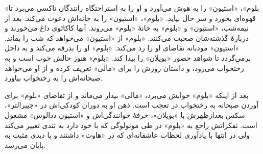 \documentclass[12pt]{book}
\newcommand{\noun}[1]{«{#1}»}
\begin{document}
    \noun{بلوم}، \noun{استیون} را به هوش می‌آورد و او را به استراحتگاه رانندگان تاکسی می‌برد تا قهوه‌ای بخورد و سر حال بیاید. \noun{بلوم}، \noun{استیون} را به خانه‌اش دعوت می‌کند.
    بعد از نیمه‌شب، \noun{استیون} و \noun{بلوم} به خانۀ \noun{بلوم} می‌روند. آنها کاکائوی داغ می‌خورند و دربارۀ گذشته‌شان صحبت می‌کنند. \noun{بلوم} از \noun{استیون} می‌خواهد که شب را بماند. \noun{استیون} مودبانه تقاضای او را رد می‌کند. \noun{بلوم} او را بدرقه می‌کند و به داخل برمی‌گردد تا شواهد حضور \noun{بویلان} را پیدا کند. \noun{بلوم} هنوز حالش خوب است و به رختخواب می‌رود، و داستان روزش را برای \noun{مالی} تعریف کرده و از او می‌خواهد صبحانه‌اش را به رختخواب بیاورد.

    بعد از اینکه \noun{بلوم} خوابش می‌برد، \noun{مالی} بیدار می‌ماند و از تقاضای \noun{بلوم} برای آوردن صبحانه به رختخواب در تعجب است. ذهن او به دوران کودکی‌اش در \noun{جیبرالتر}، سکس بعدازظهرش با \noun{بویلان}، حرفۀ خوانندگی‌اش و \noun{استیون ددالوس} مشغول است. تفکراتش راجع به \noun{بلوم} در طی مونولوگی که با خود دارد به تندی تغییر می‌کند ولی در انتها با یادآوری لحظات عاشقانه‌ای که در \noun{هاوث} داشتند و با دیدی مثبت به پایان می‌رسد.
\end{document}
